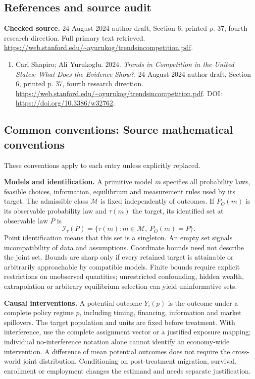 \documentclass[11pt,a4paper]{article}
\begin{document}
\subsection*{References and source audit}
\textbf{Checked source.} 24 August 2024 author draft, Section 6, printed p. 37, fourth research direction. Full primary text retrieved. \url{https://web.stanford.edu/~ayurukog/trendsincompetition.pdf}.
\begin{enumerate}\raggedright
\item\hypertarget{definitions:source:30007680:1}{} Carl Shapiro; Ali Yurukoglu. 2024. \emph{Trends in Competition in the United States: What Does the Evidence Show?}. 24 August 2024 author draft, Section 6, printed p. 37, fourth research direction.
\url{https://web.stanford.edu/~ayurukog/trendsincompetition.pdf}.
DOI: \url{https://doi.org/10.3386/w32762}.
\end{enumerate}

\subsection*{Common conventions: Source mathematical conventions}

These conventions apply to each entry unless explicitly replaced.

\textbf{Models and identification.} A primitive model \(m\) specifies all probability laws, feasible choices, information, equilibrium and measurement rules used by its target. The admissible class \(\mathcal M\) is fixed independently of outcomes. If \(P_O(m)\) is its observable probability law and \(\tau(m)\) the target, its identified set at observable law \(P\) is
\[
 \mathcal I_\tau(P)=\{\tau(m):m\in\mathcal M,\ P_O(m)=P\}.
\]
Point identification means that this set is a singleton. An empty set signals incompatibility of data and assumptions. Coordinate bounds need not describe the joint set. Bounds are sharp only if every retained target is attainable or arbitrarily approachable by compatible models. Finite bounds require explicit restrictions on unobserved quantities; unrestricted confounding, hidden wealth, extrapolation or arbitrary equilibrium selection can yield uninformative sets.

\textbf{Causal interventions.} A potential outcome \(Y_i(p)\) is the outcome under a complete policy regime \(p\), including timing, financing, information and market spillovers. The target population and units are fixed before treatment. With interference, use the complete assignment vector or a justified exposure mapping; individual no-interference notation alone cannot identify an economy-wide intervention. A difference of mean potential outcomes does not require the cross-world joint distribution. Conditioning on post-treatment migration, survival, enrollment or employment changes the estimand and needs separate justification.
\end{document}
